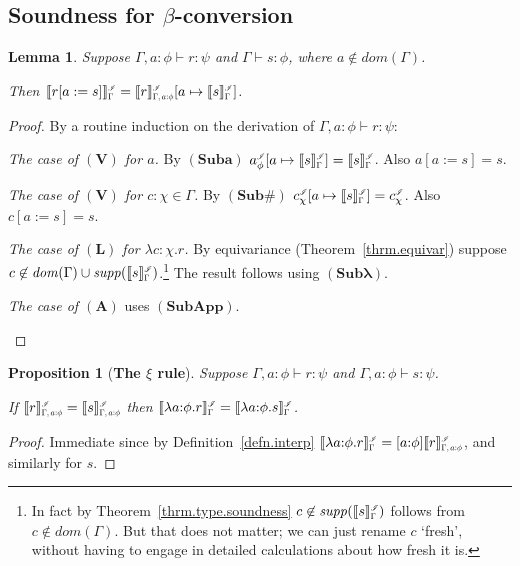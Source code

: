 \documentclass[submission,copyright]{eptcs}
\newtheorem{prop}[thrm]{Proposition}
\newtheorem{lemm}[thrm]{Lemma}
\newcommand{\f}[1]{\ensuremath{\text{$\mathit{#1}$}}}
\newcommand{\lam}[1]{\lambda{#1}.}
\newcommand{\rulefont}[1]{\ensuremath{(\mathbf{#1})}}
\newcommand{\sm}{\mapsto}
\newcommand{\ssm}{:=}
\newcommand{\dom}{\f{dom}}
\newcommand{\supp}{\f{supp}}
\newcommand\den[1]{{\hspace{.00ex}\scalebox{.55}{$#1$}}}
\newcommand{\idenot}[2]{\denot{\interp I}{#1}{#2}}
\newcommand\interp[1]{\ensuremath{\mathscr #1}}
\newcommand{\denot}[3]{\llbracket #3 \rrbracket_{\scalebox{.6}{$#2$}}^\den{#1}} \newcommand{\hdenot}[1]{\denot{\interp H}{}{#1}}
\newcommand\cent{\vdash}
\begin{document}
\subsection{Soundness for $\beta$-conversion}

\begin{lemm}
\label{lemm.st.beta.1}
Suppose $\Gamma,a{:}\phi\cent r:\psi$ and $\Gamma\cent s:\phi$, where ${a\not\in\dom(\Gamma)}$.

Then $\idenot{\Gamma}{r[a\ssm s]}=\idenot{\Gamma,a{:}\phi}{r}[a\sm\idenot{\Gamma}{s}]$.
\end{lemm}
\begin{proof}
By a routine induction on the derivation of $\Gamma,a{:}\phi\cent r:\psi$:
\begin{itemize*}
\item \emph{The case of \rulefont{V} for $a$.}\quad
By \rulefont{Suba} $a^\iden_\phi[a\sm\idenot{\Gamma}{s}]=\idenot{\Gamma}{s}$.
Also $a[a\ssm s]=s$.
\item \emph{The case of \rulefont{V} for $c{:}\chi\in\Gamma$.}\quad
By \rulefont{Sub\#} $c^\iden_\chi[a\sm\idenot{\Gamma}{s}]=c^\iden_\chi$.
Also $c[a\ssm s]=s$.
\item \emph{The case of \rulefont{L} for $\lam{c{:}\chi}r$.}\quad
By equivariance (Theorem~\ref{thrm.equivar}) suppose $c\not\in\dom(\Gamma)\cup\supp(\idenot{\Gamma}{s})$.\footnote{In fact by Theorem~\ref{thrm.type.soundness} $c\not\in\supp(\idenot{\Gamma}{s})$ follows from $c\not\in\dom(\Gamma)$.  But that does not matter; we can just rename $c$ `fresh', without having to engage in detailed calculations about how fresh it is.}
The result follows using \rulefont{Sub\text{$\lambda$}}.
\item
\emph{The case of \rulefont{A}} uses \rulefont{SubApp}.
\qedhere\end{itemize*}
\end{proof}

\begin{prop}[\bf The $\xi$ rule]
\label{prop.xi}
Suppose $\Gamma,a{:}\phi\cent r:\psi$ and $\Gamma,a{:}\phi\cent s:\psi$.

If $\idenot{\Gamma,a{:}\phi}{r}=\idenot{\Gamma,a{:}\phi}{s}$ then $\idenot{\Gamma}{\lam{a{:}\phi}r}=\idenot{\Gamma}{\lam{a{:}\phi}{s}}$.
\end{prop}
\begin{proof}
Immediate since by Definition~\ref{defn.interp} $\idenot{\Gamma}{\lam{a{:}\phi}r}=[a{:}\phi]\idenot{\Gamma,a{:}\phi}{r}$, and similarly for $s$.
\end{proof}
\end{document}
